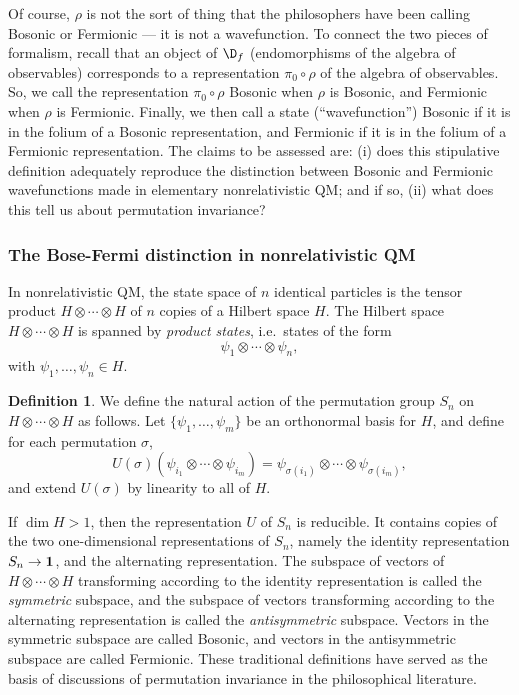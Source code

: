 \documentclass[12pt]{article}
\theoremstyle{definition}
\theoremstyle{definition}
\newtheorem{defn}[thm]{Definition}
\theoremstyle{remark}
\def\1#1{{\bf #1}}
\begin{document}
Of course, $\rho$ is not the sort of thing that the philosophers have
been calling Bosonic or Fermionic --- it is not a wavefunction.  To
connect the two pieces of formalism, recall that an object of $\D _f$
(endomorphisms of the algebra of observables) corresponds to a
representation $\pi _0\circ \rho$ of the algebra of observables.  So,
we call the representation $\pi _0\circ \rho$ Bosonic when $\rho$ is
Bosonic, and Fermionic when $\rho$ is Fermionic.  Finally, we then
call a state (``wavefunction'') Bosonic if it is in the folium of a
Bosonic representation, and Fermionic if it is in the folium of a
Fermionic representation.  The claims to be assessed are: (i) does
this stipulative definition adequately reproduce the distinction
between Bosonic and Fermionic wavefunctions made in elementary
nonrelativistic QM; and if so, (ii) what does this tell us about
permutation invariance?

\subsubsection{The Bose-Fermi distinction in nonrelativistic QM}

In nonrelativistic QM, the state space of $n$ identical particles is
the tensor product $H\otimes \cdots \otimes H$ of $n$ copies of a
Hilbert space $H$.  The Hilbert space $H\otimes \cdots \otimes H$ is
spanned by \emph{product states}, i.e.\ states of the form
$$ \psi _1\otimes \cdots \otimes \psi _n ,$$
with $\psi _1,\dots ,\psi _n\in H$.  

\begin{defn} We define the natural action of the permutation group
  $S_n$ on $H\otimes \cdots \otimes H$ as follows.  Let $\{ \psi
  _1,\dots ,\psi _m\}$ be an orthonormal basis for $H$, and define for
  each permutation $\sigma$,
$$ U(\sigma )(\psi _{i_1}\otimes \cdots \otimes \psi _{i_m}) = \psi
_{\sigma (i_1)}\otimes \cdots \otimes \psi _{\sigma (i_m)} ,$$
and extend $U(\sigma )$ by linearity to all of $H$.  
\end{defn}
If $\dim H>1$, then the representation $U$ of $S_n$ is reducible.  It
contains copies of the two one-dimensional representations of $S_n$,
namely the identity representation $S_n\to \11$, and the alternating
representation.  The subspace of vectors of $H\otimes \cdots \otimes
H$ transforming according to the identity representation is called the
\emph{symmetric} subspace, and the subspace of vectors transforming
according to the alternating representation is called the
\emph{antisymmetric} subspace.  Vectors in the symmetric subspace are
called Bosonic, and vectors in the antisymmetric subspace are called
Fermionic.  These traditional definitions have served as the basis of
discussions of permutation invariance in the philosophical literature.
\end{document}
